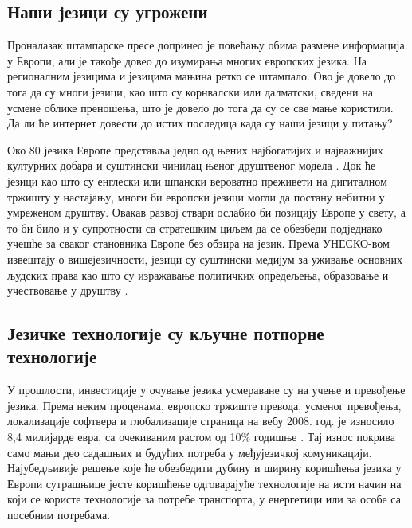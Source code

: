 \begin{multicols}{2}
\subsection {Наши језици су угрожени}
  
Проналазак штампарске пресе допринео је повећању обима размене информација у Европи, али је такође довео до изумирања многих европских језика. На регионалним језицима и језицима мањина ретко се штампало. Ово је довело до тога да су многи језици, као што су корнвалски или далматски, сведени на усмене облике преношења, што је довело до тога да су се све мање користили.  Да ли ће интернет довести до истих последица када су наши језици у питању?


Око 80 језика Европе представља једно од њених најбогатијих и најважнијих културних добара и суштински чинилац њеног друштвеног модела  \cite{EC2}. Док ће језици као што су енглески или шпански вероватно преживети на дигиталном тржишту у настајању, многи би европски језици могли да постану небитни у умреженом друштву. Овакав развој ствари ослабио би позицију Европе у свету, а то би било и у супротности са стратешким циљем да се обезбеди подједнако учешће за сваког становника Европе без обзира на језик. Према УНЕСКО-вом извештају о вишејезичности, језици су суштински медијум за уживање основних људских права као што су изражавање политичких опредељења, образовање и учествовање у друштву  \cite{Unesco1}.


\subsection {Језичке технологије су кључне потпорне технологије}
  
У прошлости, инвестиције у очување језика усмераване су на учење и превођење језика. Према неким проценама, европско тржиште превода, усменог превођења, локализације софтвера и глобализације страница на вебу  2008. год. је износило 8,4 милијарде евра, са очекиваним растом од 10\% годишње \cite{EC3}. Тај износ покрива само мањи део садашњих и будућих потреба у међујезичкој комуникацији. Најубедљивије решење које ће обезбедити дубину и ширину коришћења језика у Европи сутрашњице јесте коришћење одговарајуће технологије на исти начин на који се користе технологије за потребе транспорта, у енергетици или за особе са посебним потребама. 


\end{multicols}
